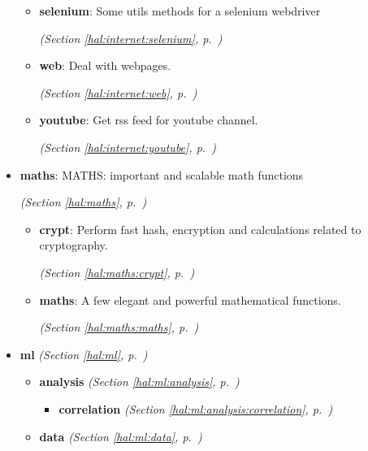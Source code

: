 \begin{itemize}
\begin{itemize}
    \item \textbf{selenium}: Some utils methods for a selenium webdriver 


  \textit{(Section \ref{hal:internet:selenium}, p.~\pageref{hal:internet:selenium})}

    \item \textbf{web}: Deal with webpages. 


  \textit{(Section \ref{hal:internet:web}, p.~\pageref{hal:internet:web})}

    \item \textbf{youtube}: Get rss feed for youtube channel. 


  \textit{(Section \ref{hal:internet:youtube}, p.~\pageref{hal:internet:youtube})}

  \end{itemize}
\item \textbf{maths}: MATHS: important and scalable math functions 


  \textit{(Section \ref{hal:maths}, p.~\pageref{hal:maths})}

  \begin{itemize}
\setlength{\parskip}{0ex}
    \item \textbf{crypt}: Perform fast hash, encryption and calculations related to cryptography. 


  \textit{(Section \ref{hal:maths:crypt}, p.~\pageref{hal:maths:crypt})}

    \item \textbf{maths}: A few elegant and powerful mathematical functions. 


  \textit{(Section \ref{hal:maths:maths}, p.~\pageref{hal:maths:maths})}

  \end{itemize}
\item \textbf{ml}
  \textit{(Section \ref{hal:ml}, p.~\pageref{hal:ml})}

  \begin{itemize}
\setlength{\parskip}{0ex}
    \item \textbf{analysis}
  \textit{(Section \ref{hal:ml:analysis}, p.~\pageref{hal:ml:analysis})}

      \begin{itemize}
    \setlength{\parskip}{0ex}
        \item \textbf{correlation}
  \textit{(Section \ref{hal:ml:analysis:correlation}, p.~\pageref{hal:ml:analysis:correlation})}

      \end{itemize}
    \item \textbf{data}
  \textit{(Section \ref{hal:ml:data}, p.~\pageref{hal:ml:data})}


\end{itemize}
\end{itemize}
